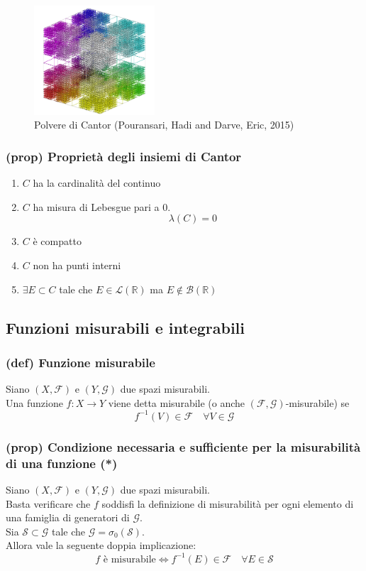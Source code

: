 \begin{figure}[H] %
    \centering
    \includegraphics[width=0.4\textwidth]{assets/Three-dimensional-Cantor-set-FMM-tree-for-N-4096-t-1-and-d-H-2-For.png}
    \caption{Polvere di Cantor (Pouransari, Hadi and Darve, Eric, 2015) \cite{article}
}
    \label{fig:example_image}
\end{figure}
\subsubsection{(prop) Proprietà degli insiemi di Cantor}
\begin{enumerate}
    \item $C$ ha la cardinalità del continuo
    \item $C$ ha misura di Lebesgue pari a 0.\\$$\lambda(C)=0$$
    \item $C$ è compatto
    \item $C$ non ha punti interni
    \item $\exists E\subset C$ tale che $E\in \mathcal L(\mathbb R)$ ma $E\notin \mathcal B(\mathbb R)$
\end{enumerate}
\subsection{Funzioni misurabili e integrabili}
\subsubsection{(def) Funzione misurabile}
Siano $(X,\mathcal F)$ e $(Y,\mathcal G)$ due spazi misurabili.\\
Una funzione $f:X\to Y$ viene detta misurabile (o anche $(\mathcal {F,G})$-misurabile) se $$f^{-1}(V)\in \mathcal F\quad \forall V\in\mathcal G$$
\subsubsection{(prop) Condizione necessaria e sufficiente per la misurabilità di una funzione (*)}
Siano $(X,\mathcal F)$ e $(Y,\mathcal G)$ due spazi misurabili.\\
Basta verificare che $f$ soddisfi la definizione di misurabilità per ogni elemento di una famiglia di generatori di $\mathcal G$.\\
Sia $\mathcal S\subset \mathcal G$ tale che $\mathcal G=\sigma_0(\mathcal S)$.\\
Allora vale la seguente doppia implicazione:
$$f \text{ è misurabile}\iff f^{-1}(E)\in \mathcal F\quad  \forall E\in \mathcal S$$

